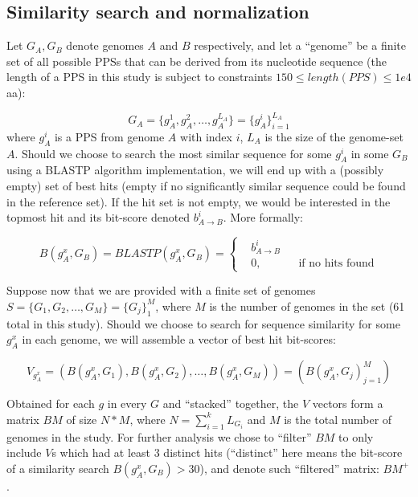 \subsection{Similarity search and normalization}
\label{simsearch}
Let $G_A, G_B$ denote genomes $A$ and $B$ respectively, and let a ``genome'' be
a finite set of all possible PPSs that can be derived from its nucleotide
sequence (the length of a PPS in this study is subject to constraints $150 \leq
length(PPS) \leq 1e4$ aa):

\begin{equation}
G_A = \{g_A^1, g_A^2, \ldots, g_A^{L_A}\} = \{g_A^i\}_{i=1}^{L_A}
\end{equation}
where $g_A^i$ is a PPS from genome $A$ with index $i$, $L_A$ is the size of
the genome-set $A$.
Should we choose to search the most similar sequence for some $g_A^i$ in some
$G_B$ using a BLASTP algorithm implementation, we will end up with a (possibly
empty) set of best hits (empty if no significantly similar sequence could be
found in the reference set). If the hit set is not empty, we would be
interested in the topmost hit and its bit-score denoted $b_{A \rightarrow
B}^i$. More formally:

\begin{equation}
B(g_A^x, G_B) = BLASTP(g_A^x, G_B)=\left \{
\begin{aligned}
&b_{A \rightarrow B}^i\\
&0, && \text{if no hits found}
\end{aligned} \right.
\end{equation}

Suppose now that we are provided with a finite set of genomes \\
$S = \{G_1, G_2, \ldots, G_M\} = \{G_j\}_1^M$, where $M$ is the number of
genomes in the set (61 total in this study). Should we choose to search for
sequence similarity for some $g_A^x$ in each genome, we will assemble a
vector of best hit bit-scores:

\begin{equation}
V_{g_A^x} = (B(g_A^x, G_1), B(g_A^x, G_2), \ldots, B(g_A^x, G_M)) = (B(g_A^x,
G_j)_{j=1}^M)
\end{equation}

Obtained for each $g$ in every $G$ and ``stacked'' together, the $V$ vectors
form a matrix $BM$ of size $N*M$, where $N=\sum_{i=1}^k L_{G_i}$ and $M$ is
the total number of genomes in the study.
For further analysis we chose
to ``filter'' $BM$ to only include $V$s which had at least 3 distinct hits
(``distinct'' here means the bit-score of a similarity search $B(g_A^x,
G_B)>30$), and denote such ``filtered'' matrix: $BM^+$.

